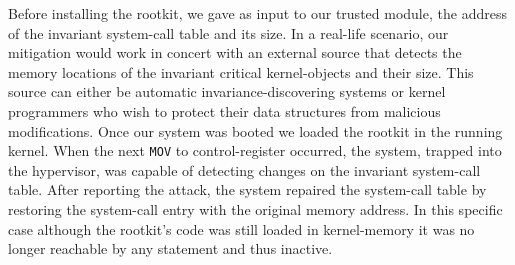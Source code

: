 %
%
%

Before installing the rootkit, we gave as input to our trusted module, the address of the invariant system-call table
and its size. In a real-life scenario, our mitigation would work in concert with an external source that detects the memory locations of the invariant critical kernel-objects and their size. This source can either be automatic invariance-discovering systems or kernel programmers who wish to protect their data structures from malicious modifications. 
Once our system was booted we loaded the rootkit in the running kernel. When the next \texttt{MOV} to control-register occurred, the system, trapped into the hypervisor, was capable of detecting changes on the invariant system-call table. After reporting the attack, the system repaired the system-call table by restoring the system-call entry with the original memory address. In this specific case although the rootkit's code was still loaded in kernel-memory it was no longer reachable by any statement and thus inactive. 


